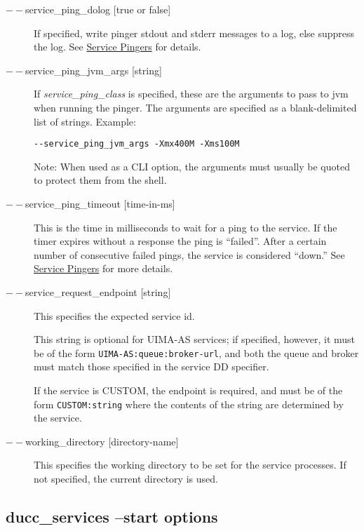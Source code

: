 \begin{description}
      \item[$--$service\_ping\_dolog {[true or false]}] If specified, write pinger stdout and stderr
        messages to a log, else suppress the log. See \hyperref[sec:service.pingers]{Service Pingers}
        for details.

      \item[$--$service\_ping\_jvm\_args {[string]}] If 
        {\em service\_ping\_class} is specified, these are the arguments 
        to pass to jvm when running the pinger. The arguments are specified as a blank-delimited
        list of strings.  Example:
\begin{verbatim}
--service_ping_jvm_args -Xmx400M -Xms100M
\end{verbatim}
        
        Note: When used as a CLI option, the arguments must usually be
        quoted to protect them from the shell.

      \item[$--$service\_ping\_timeout {[time-in-ms]}] This is the time in milliseconds to wait for a
        ping to the service.  If the timer expires without a response the ping is ``failed''. After
        a certain number of consecutive failed pings, the service is considered ``down.''  See
        \hyperref[sec:service.pingers]{Service Pingers} for more details.

      \item[$--$service\_request\_endpoint {[string]}] This specifies the expected service id.  
        \begin{sloppypar}
          This string is optional for UIMA-AS services; if specified, however, it must be of the
          form {\tt UIMA-AS:queue:broker-url}, and both the queue and broker must match those specified in the
          service DD specifier.
        \end{sloppypar}

        If the service is CUSTOM, the endpoint is required, and must be of the form
        {\tt CUSTOM:string} where the contents of the string are determined by the service.
        
        \item[$--$working\_directory {[directory-name]}]
          This specifies the working directory to be set for the service processes. 
          If not specified, the current directory is used.
    \end{description}


    \subsection{ducc\_services --start options}

